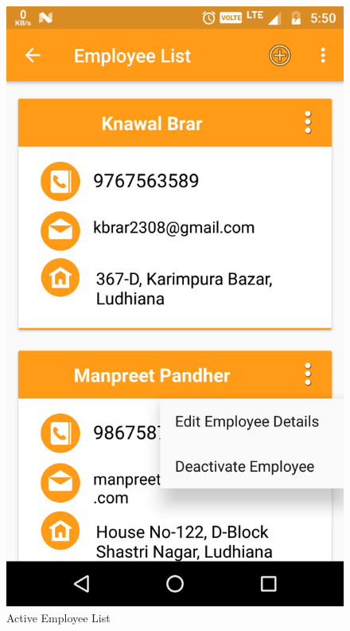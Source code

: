 \\
\begin{figure}[h]
	\centering
	\includegraphics[width=0.7\linewidth]{ActiveEmployeeList}
	\caption{Active Employee List}
\end{figure}
\pagebreak

